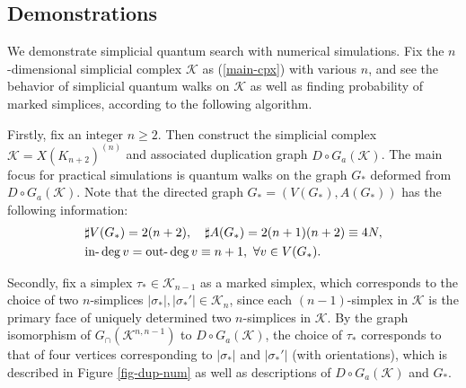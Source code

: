 \documentclass[a4paper,12pt]{article}
\numberwithin{equation}{section}
\begin{document}
\subsection{Demonstrations}
We demonstrate simplicial quantum search with numerical simulations.
Fix the $n$-dimensional simplicial complex $\mathcal{K}$ as (\ref{main-cpx}) with various $n$, and see the behavior of simplicial quantum walks on $\mathcal{K}$ as well as finding probability of marked simplices, according to the following algorithm.
\par
\bigskip
Firstly, fix an integer $n\geq 2$.
Then construct the simplicial complex $\mathcal{K}=X(K_{n+2})^{(n)}$ and associated duplication graph $D\circ G_a(\mathcal{K})$.
The main focus for practical simulations is quantum walks on the graph $G_\ast$ deformed from $D\circ G_a(\mathcal{K})$.
Note that the directed graph $G_\ast = (V(G_\ast), A(G_\ast))$ has the following information:
\begin{align*}
&\sharp V(G_\ast) = 2(n+2),\quad \sharp A(G_\ast) = 2(n+1)(n+2)\equiv 4N,\\
&{\rm in\text{-}}\deg v = {\rm out\text{-}}\deg v \equiv n+1,\ \forall v\in V(G_\ast).
\end{align*}
\par
Secondly, fix a simplex $\tau_\ast \in \mathcal{K}_{n-1}$ as a marked simplex, which corresponds to the choice of two $n$-simplices $|\sigma_\ast|, |\sigma_\ast'|\in \mathcal{K}_n$, since each $(n-1)$-simplex in $\mathcal{K}$ is the primary face of uniquely determined two $n$-simplices in $\mathcal{K}$.
By the graph isomorphism of $G_\cap(\mathcal{K}^{n,n-1})$ to $D\circ G_a(\mathcal{K})$, the choice of $\tau_\ast$ corresponds to that of four  vertices corresponding to $|\sigma_\ast|$ and $|\sigma_\ast'|$ (with orientations), which is described in Figure \ref{fig-dup-num} as well as descriptions of $D\circ G_a(\mathcal{K})$ and $G_\ast$.
\end{document}
